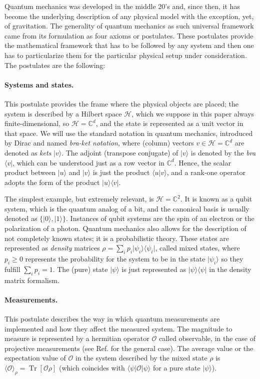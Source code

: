 \documentclass[smallextended]{svjour3}
\renewcommand{\1}{\mathbbm{1}}
\newcommand{\tr}{\operatorname{Tr}}
\newcommand{\ket} [1] {\vert #1 \rangle}
\newcommand{\bra} [1] {\langle #1 \vert}
\begin{document}
Quantum mechanics was developed in the middle 20's and, since then, it has become the underlying description of any physical model with the exception, yet, of gravitation.
%
The generality of quantum mechanics as such universal framework came from its formulation as four axioms or postulates. These postulates provide the mathematical framework that has to be followed by any system and then one has to particularize them for the particular physical setup under consideration. The postulates are the following:\\

\paragraph{Systems and states.} This postulate provides the frame where the physical objects are placed; the system is described by a Hilbert space $\mathcal{H}$, which we suppose in this paper always finite-dimensional, so $\mathcal{H}=\mathbb{C}^d$, and the state is represented as a unit vector in that space.
%
We will use the standard notation in quantum mechanics, introduced by Dirac \cite{Dirac} and named  {\it bra-ket notation}, where (column) vectors $v \in \mathcal{H}=\mathbb{C}^d$ are denoted as \emph{kets} $\ket{v}$.  The adjoint (transpose conjugate) of $\ket{v}$ is denoted by the \emph{bra} $\bra{v}$, which can be understood just as a row vector in $\mathbb{C}^d$. Hence, the scalar product between $\ket{u}$ and $\ket{v}$ is just the product $\langle u |v \rangle$, and a rank-one operator adopts the form of the product $\ket{u}\bra{v}$.


The simplest example, but extremely relevant, is $\mathcal{H}=\mathbb{C}^{2}$. It is known as a qubit system, which is the quantum analog of a bit, and the canonical basis is usually denoted as $\{ \ket{0},\ket{1}\}$. Instances of qubit systems are the spin of an electron or the polarization of a photon. Quantum mechanics also allows for the description of not completely known states; it is a probabilistic theory. These states are represented as \emph{density} matrices $\rho= \sum_i p_i \ket{\psi_i} \bra{\psi_i}$, called mixed states, where $p_i \ge 0$ represents the probability for the system to be in the state $\ket{\psi_i}$ so they fulfill $\sum_i p_i=1$. The (pure) state $\ket{\psi}$ is just represented as $\ket{\psi}\bra{\psi}$ in the density matrix formalism.

\paragraph{Measurements.} This postulate describes the way in which quantum measurements are implemented and how they affect the measured system. The magnitude to measure is represented by a hermitian operator $\mathcal{O}$ called observable, in the case of projective measurements (see Ref. \cite{NielsenChuang} for the general case). The average value or the expectation value of $\mathcal{O}$ in the system described by the mixed state $\rho$ is $\langle \mathcal{O} \rangle_\rho=\tr[\mathcal{O}\rho]$ (which coincides with  $\bra{\psi} \mathcal{O} \ket{\psi}$ for a pure state $\ket{\psi}$).
\end{document}
